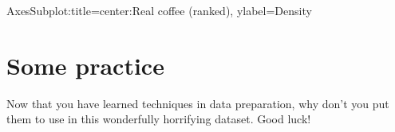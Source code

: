 \documentclass[letterpaper,10pt,english]{jupyterBook}
\begin{document}
\begin{sphinxVerbatim}[commandchars=\\\{\}]
\PYG{p}{[}\PYG{p}{]} 
\end{sphinxVerbatim}

\begin{sphinxVerbatim}[commandchars=\\\{\}]
\PYGZlt{}AxesSubplot:title=\PYGZob{}\PYGZsq{}center\PYGZsq{}:\PYGZsq{}Real coffee (ranked)\PYGZsq{}\PYGZcb{}, ylabel=\PYGZsq{}Density\PYGZsq{}\PYGZgt{}
\end{sphinxVerbatim}

\noindent{}


\chapter{Some practice}
\label{\detokenize{c2_data_preparation/some_practice:some-practice}}\label{\detokenize{c2_data_preparation/some_practice::doc}}
\sphinxAtStartPar
Now that you have learned techniques in data preparation, why don’t you put them to use in this wonderfully horrifying dataset. Good luck!

\begin{sphinxVerbatim}[commandchars=\\\{\}]
 
 

   
\end{sphinxVerbatim}
\end{document}
